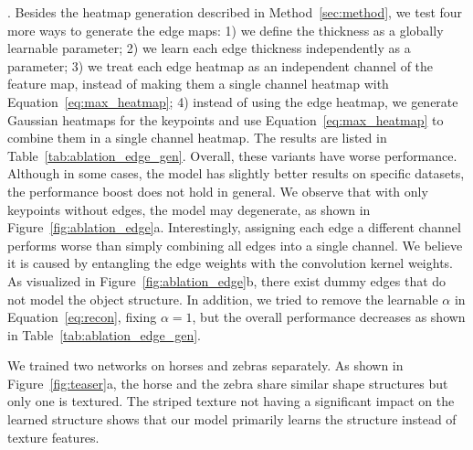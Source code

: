 \documentclass{article}
\begin{document}
. 
Besides the heatmap generation described in Method~\ref{sec:method}, we test four more ways to generate the edge maps: 1) we define the thickness as a globally learnable parameter; 2) we learn each edge thickness independently as a parameter; 3) we treat each edge heatmap as an independent channel of the feature map, instead of making them a single channel heatmap with Equation~\ref{eq:max_heatmap}; 4) instead of using the edge heatmap, we generate Gaussian heatmaps for the keypoints and use Equation~\ref{eq:max_heatmap} to combine them in a single channel heatmap. The results are listed in Table~\ref{tab:ablation_edge_gen}. Overall, these variants have worse performance. Although in some cases, the model has slightly better results on specific datasets, the performance boost does not hold in general. We observe that with only keypoints without edges, the model may degenerate, as shown in Figure~\ref{fig:ablation_edge}a. Interestingly, assigning each edge a different channel performs worse than simply combining all edges into a single channel. We believe it is caused by entangling the edge weights with the convolution kernel weights. As visualized in Figure~\ref{fig:ablation_edge}b, there exist dummy edges that do not model the object structure.
In addition, we tried to remove the learnable $\alpha$ in Equation~\ref{eq:recon}, fixing $\alpha=1$, but the overall performance decreases as shown in Table~\ref{tab:ablation_edge_gen}.



We trained two networks on horses and zebras separately. As shown in Figure~\ref{fig:teaser}a, the horse and the zebra share similar shape structures but only one is textured. The striped texture not having a significant impact on the learned structure shows that our model primarily learns the structure instead of texture features.
\end{document}
